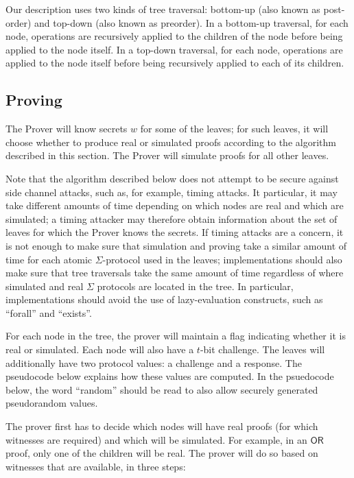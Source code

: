 \documentclass[11pt]{article}
\newcommand{\ornode}{\ensuremath{\mathsf{OR}}}
\begin{document}
Our description uses two kinds of tree traversal: bottom-up (also known as post-order) and top-down (also known as preorder). In a bottom-up traversal, for each node, operations are recursively applied to the children of the node before being applied to the node itself. In a top-down traversal, for each node, operations are applied to the node itself before being recursively applied to each of its children.

\subsection{Proving}
\label{sec:proving}

The Prover will know secrets $w$ for some of the leaves; for such leaves, it will choose whether to produce real or simulated proofs according to the algorithm described in this section. The Prover will simulate proofs for all other leaves. 

Note that the algorithm described below does not attempt to be secure against side channel attacks, such as, for example, timing attacks. It particular, it may take different amounts of time depending on which nodes are real and which are simulated; a timing attacker may therefore obtain information about the set of leaves for which the Prover knows the secrets. If timing attacks are a concern, it is not enough to make sure that simulation and proving take a similar amount of time for each atomic $\Sigma$-protocol used in the leaves; implementations should also make sure that tree traversals take the same amount of time regardless of where simulated and real $\Sigma$ protocols are located in the tree. In particular, implementations should avoid the use of lazy-evaluation constructs, such as ``forall'' and ``exists''.


For each node in the tree, the prover will maintain a flag indicating whether it is real or simulated. Each node will also have a $t$-bit challenge. The leaves will additionally have two protocol values: a challenge and a response. The pseudocode below explains how these values are computed. In the psuedocode below, the word ``random'' should be read to also allow securely generated pseudorandom values.

The prover first has to decide which nodes will have real proofs (for which witnesses are required) and which will be simulated. For example, in an $\ornode$ proof, only one of the children will be real. The prover will do so based on witnesses that are available, in three steps:
\end{document}
